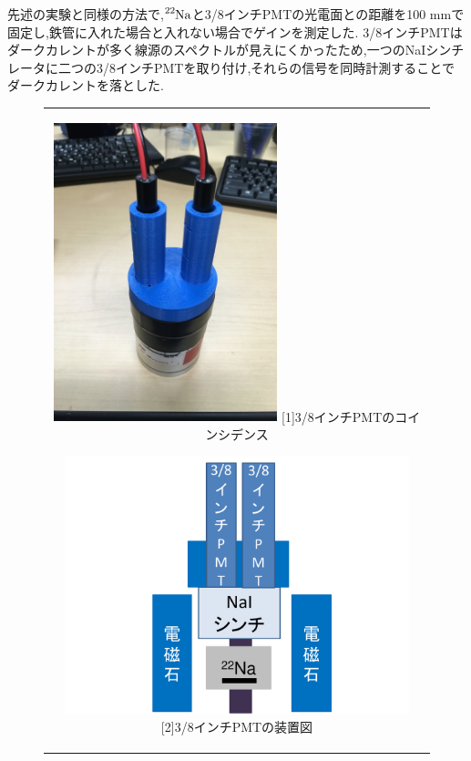 先述の実験と同様の方法で,$\ce{^{22}Na}$と3/8インチPMTの光電面との距離を100 mmで固定し,鉄管に入れた場合と入れない場合でゲインを測定した.
3/8インチPMTはダークカレントが多く線源のスペクトルが見えにくかったため,一つのNaIシンチレータに二つの3/8インチPMTを取り付け,それらの信号を同時計測することでダークカレントを落とした.


\begin{figure}[h]
  \begin{center}
    \begin{tabular}{c}
      \begin{minipage}[h]{0.4\hsize}    
        \begin{center}
          \includegraphics[width=6.5cm]{fig/iguchi/PPMT.jpg}
	\hspace{3cm}[1]3/8インチPMTのコインシデンス
     \end{center}
    \end{minipage}
      \begin{minipage}[h]{0.6\hsize}    
        \begin{center}
          \includegraphics[width=10cm]{fig/iguchi/miniset.pdf}
         \hspace{3cm}[2]3/8インチPMTの装置図
         \end{center}
        \end{minipage}
     
     \end{tabular}
    \end{center}
   \end{figure}
   

